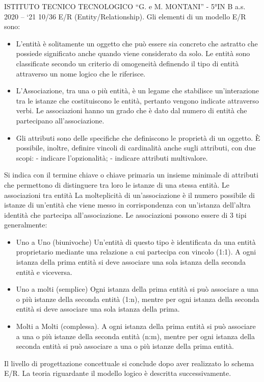\documentclass{article}
\begin{document}
	ISTITUTO TECNICO TECNOLOGICO “G. e M. MONTANI” - 5°IN B a.s. 2020 – ‘21 10/36
	E/R (Entity/Relationship).
	Gli elementi di un modello E/R sono:
	\begin{itemize}
		\item L’entità è solitamente un oggetto che può essere sia concreto che astratto che possiede
		significato anche quando viene considerato da solo.
		Le entità sono classificate secondo un criterio di omogeneità definendo il tipo di entità
		attraverso un nome logico che le riferisce.
		\item L’Associazione, tra una o più entità, è un legame che stabilisce un'interazione tra le
		istanze che costituiscono le entità, pertanto vengono indicate attraverso verbi.
		Le associazioni hanno un grado che è dato dal numero di entità che partecipano
		all’associazione.
		\item Gli attributi sono delle specifiche che definiscono le proprietà di un oggetto.
		È possibile, inoltre, definire vincoli di cardinalità anche sugli attributi, con due scopi:
		- indicare l’opzionalità;
		- indicare attributi multivalore.
	\end{itemize}
	Si indica con il termine chiave o chiave primaria un insieme minimale di attributi che
	permettono di distinguere tra loro le istanze di una stessa entità.
	Le associazioni tra entità
	La molteplicità di un’associazione è il numero possibile di istanze di un’entità che
	viene messo in corrispondenza con un’istanza dell’altra identità che partecipa
	all’associazione.
	Le associazioni possono essere di 3 tipi generalmente:
	\begin{itemize}
		\item Uno a Uno (biunivoche)
		Un'entità di questo tipo è identificata da una entità proprietario mediante una relazione
		a cui partecipa con vincolo (1:1). A ogni istanza della prima entità si deve associare
		una sola istanza della seconda entità e viceversa.
		\item Uno a molti (semplice)
		Ogni istanza della prima entità si può associare a una o più istanze della seconda entità
		(1:n), mentre per ogni istanza della seconda entità si deve associare una sola istanza
		della prima.
		\item Molti a Molti (complessa).
		A ogni istanza della prima entità si può associare a una o più istanze della seconda
		entità (n:m), mentre per ogni istanza della seconda entità si può associare a una o più istanze della prima entità.
	\end{itemize}
	Il livello di progettazione concettuale si conclude dopo aver realizzato lo schema E/R.
	La teoria riguardante il modello logico è descritta successivamente.
\end{document}
